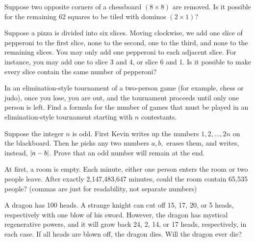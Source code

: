 \documentclass[12pt]{article}
\begin{document}
        \begin{exercise}
            Suppose two opposite corners of a chessboard \((8\times 8)\) are removed. Is it possible for the remaining 62 squares to be tiled with dominos \((2\times 1)\)?
        \end{exercise}

        \begin{exercise}
            Suppose a pizza is divided into six slices. Moving clockwise, we add one slice of pepperoni to the first slice, none to the second, one to the third, and none to the remaining slices. You may only add one pepperoni to each adjacent slice. For instance, you may add one to slice 3 and 4, or slice 6 and 1. Is it possible to make every slice contain the same number of pepperoni?
        \end{exercise}
    
        \begin{exercise}
            In an elimination-style tournament of a two-person game (for example, chess or judo), once you lose, you are out, and the tournament proceeds until only one person is left. Find a formula for the number of games that must be played in an elimination-style tournament starting with \(n\) contestants.
        \end{exercise}
    
        \begin{exercise}
            Suppose the integer \(n\) is odd. First Kevin writes up the numbers \(1, 2, \ldots, 2n\) on the blackboard. Then he picks any two numbers \(a, b,\) erases them, and writes, instead, \(\left\lvert a-b \right\rvert\). Prove that an odd number will remain at the end.
        \end{exercise}
    
        \begin{exercise}
            At first, a room is empty. Each minute, either one person enters the room or two people leave. After exactly 2,147,483,647 minutes, could the room contain 65,535 people? (commas are just for readability, not separate numbers)
        \end{exercise}
    
        \begin{exercise}
            A dragon has 100 heads. A strange knight can cut off 15, 17, 20, or 5 heads, respectively with one blow of his sword. However, the dragon has mystical regenerative powers, and it will grow back 24, 2, 14, or 17 heads, respectively, in each case. If all heads are blown off, the dragon dies. Will the dragon ever die?
        \end{exercise}
    
\end{document}
